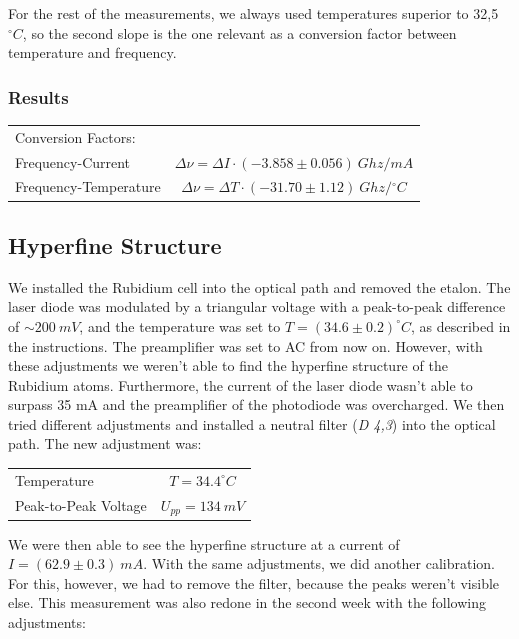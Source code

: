 For the rest of the measurements, we always used temperatures superior to 32,5 $^\circ C$, so the second slope is the one relevant as a conversion factor between temperature and frequency.

\subsubsection{Results}

\begin{tabular}[H]{l c}
Conversion Factors: & \\
Frequency-Current & $\Delta\nu = \Delta I \cdot (-3.858 \pm 0.056)\ {Ghz}/{mA}$\\
Frequency-Temperature & $\Delta\nu = \Delta T \cdot (-31.70 \pm 1.12)\ {Ghz}/{^\circ C}$\\
\end{tabular}


\subsection{Hyperfine Structure}

We installed the Rubidium cell into the optical path and removed the etalon. The laser diode was modulated by a triangular voltage with a peak-to-peak difference of $\sim 200\ mV$, and the temperature was set to $T = (34.6 \pm 0.2)^\circ C$, as described in the instructions. The preamplifier was set to AC from now on. However, with these adjustments we weren't able to find the hyperfine structure of the Rubidium atoms. Furthermore, the current of the laser diode wasn't able to surpass 35 mA and the preamplifier of the photodiode  was overcharged. We then tried different adjustments and installed a neutral filter (\emph{D 4,3}) into the optical path. The new adjustment was:\\

\begin{center}
\begin{tabular}[H]{l c}
Temperature & $T=34.4 ^\circ C$\\
Peak-to-Peak Voltage & $U_{pp} = 134\ mV$\\
\end{tabular}
\end{center}

We were then able to see the hyperfine structure at a current of $I = (62.9 \pm 0.3)\ mA$. With the same adjustments, we did another calibration. For this, however, we had to remove the filter, because the peaks weren't visible else. This measurement was also redone in the second week with the following adjustments:

